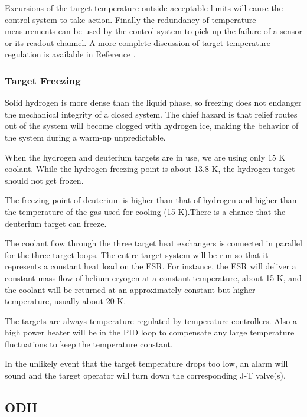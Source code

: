 {Excursions of the target temperature outside acceptable limits will
cause the control system to take action.
Finally the redundancy of temperature measurements can be used by the
control system to pick up the failure of a sensor or its readout channel.
A more complete discussion of target temperature regulation is available
in Reference \cite{bi:tgts}.

\subsubsection{Target Freezing}

\begin{safetyen}{10}{5}
Solid hydrogen is more dense than the liquid phase, so freezing does not
endanger the mechanical integrity of a closed system. The chief hazard is that
relief routes out of the system will become clogged with hydrogen ice,
making the behavior of the system during a warm-up unpredictable.
\end{safetyen} 
When the hydrogen and deuterium targets are in use,
we are using only 15 K coolant. While the hydrogen freezing point
is about 13.8 K, the hydrogen target should not get frozen. 
\begin{safetyen}{10}{5}
The freezing point of deuterium is higher than that of hydrogen
and higher than the temperature of the gas used for
cooling (15 K).There is 
a chance that the deuterium target can freeze.
\end{safetyen}

The coolant flow through the three target heat exchangers is
connected in parallel for the three target loops.
The entire target system will be run so that it
represents a constant heat load on the ESR. For instance,
the ESR will deliver
a constant mass flow of helium cryogen at a constant temperature, about
15 K, and the coolant will be returned at an approximately 
constant but higher temperature, usually about 20 K.

The targets are always temperature regulated by
temperature controllers. Also a high power heater will be in the PID loop
to compensate any large temperature fluctuations to keep the temperature 
constant.
\begin{safetyen}{10}{5}
In the unlikely event that the target temperature drops too low,
an alarm will sound and the target operator will turn down the corresponding
J-T valve(s). 

\subsection{ODH}


\end{safetyen}}

